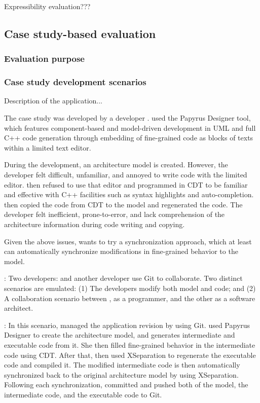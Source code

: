 Expressibility evaluation???

\subsection{Case study-based evaluation}

\subsubsection{Evaluation purpose}

\subsubsection{Case study development scenarios}

Description of the application...

The case study was developed by a developer . 
 used the Papyrus Designer tool, which features component-based and model-driven development in UML and full C++ code generation through embedding of fine-grained code as blocks of texts within a limited text editor.   

During the development, an architecture model is created.
However, the developer felt difficult, unfamiliar, and annoyed to write code with the limited editor.
 then refused to use that editor and programmed in CDT to be familiar and effective with C++ facilities such as syntax highlights and auto-completion.
 then copied the code from CDT to the model and regenerated the code.
The developer felt inefficient, prone-to-error, and lack comprehension of the architecture information during code writing and copying.

Given the above issues,  wants to try a synchronization approach, which at least can automatically synchronize modifications in fine-grained behavior to the model.

\vskip 0.1cm
\noindent
{}:
Two developers:  and another developer use Git to collaborate. 
Two distinct scenarios are emulated: (1) The developers modify both model and code; and (2) A collaboration scenario between , as a programmer, and the other as a software architect. 


\vskip 0.1cm
\noindent
{}:
In this scenario,  managed the application revision by using Git.
 used Papyrus Designer to create the architecture model, and generates intermediate and executable code from it.
She then filled fine-grained behavior in the intermediate code using CDT.
After that,  then used XSeparation to regenerate the executable code and compiled it.
The modified intermediate code is then automatically synchronized back to the original architecture model by using XSeparation.
Following each synchronization,  committed and pushed both of the model, the intermediate code, and the executable code to Git.  


